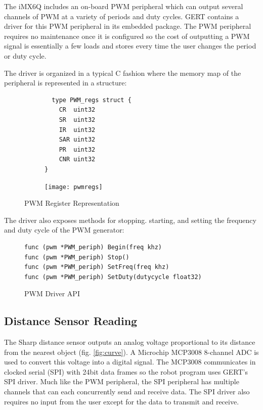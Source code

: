 The iMX6Q includes an on-board PWM peripheral which can output several channels of PWM
at a variety of periods and duty cycles. GERT contains a driver for this PWM peripheral in its embedded
package. The PWM peripheral requires no maintenance once it is configured so the cost of outputting
a PWM signal is essentially a few loads and stores every time the user changes the period or duty cycle.

The driver is organized in a typical C fashion where the memory map of the peripheral is represented in a structure:
\begin{figure}[h]
  \begin{subfigure}[t!]{0.5\textwidth}
  \begin{lstlisting}
  type PWM_regs struct {
	CR  uint32
	SR  uint32
	IR  uint32
	SAR uint32
	PR  uint32
	CNR uint32
}
  \end{lstlisting}
  \end{subfigure}
  \begin{subfigure}[t!]{0.5\textwidth}
 \texttt{[image: pwmregs]}
  \end{subfigure}
  \caption{PWM Register Representation} \label{fig:pwm_struct}
\end{figure}

The driver also exposes methods for stopping. starting, and setting the
frequency and duty cycle of the PWM generator:
\begin{figure}[h]
  \begin{lstlisting}
func (pwm *PWM_periph) Begin(freq khz)
func (pwm *PWM_periph) Stop()
func (pwm *PWM_periph) SetFreq(freq khz)
func (pwm *PWM_periph) SetDuty(dutycycle float32)
  \end{lstlisting}
  \caption{PWM Driver API} \label{fig:pwm_api}
\end{figure}

\subsection{Distance Sensor Reading}
The Sharp distance sensor outputs an analog voltage proportional to its distance from the nearest object (fig. \ref{fig:curve}).
A Microchip MCP3008 8-channel ADC is used to convert this voltage into a digital signal. The MCP3008 communicates in clocked
serial (SPI) with 24bit data frames so the robot program uses GERT's SPI driver. Much like the
PWM peripheral, the SPI peripheral has multiple channels that can each concurrently send and receive data. The SPI
driver also requires no input from the user except for the data to transmit and receive.

